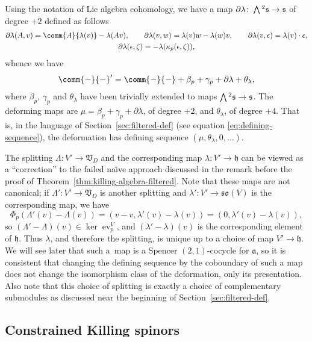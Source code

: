 \documentclass[10pt,a4paper]{amsart}
\numberwithin{equation}{section}
\newcommand{\fa}{\mathfrak{a}}
\newcommand{\fh}{\mathfrak{h}}
\newcommand{\fs}{\mathfrak{s}}
\newcommand{\fso}{\mathfrak{so}}
\newcommand{\fV}{\mathfrak{V}}
\newcommand{\Wedge}{\mathchoice{{\textstyle\bigwedge}}{\bigwedge}{\bigwedge}{\bigwedge}}	%
\newcommand{\1}{\mathbbm{1}}
\DeclareMathOperator{\evaluate}{ev}
\begin{document}
Using the notation of Lie algebra cohomology, we have a map $\partial\lambda\colon\Wedge^2\fs\to\fs$ of degree $+2$ defined as follows
\begin{gather*}
	\partial\lambda(A,v) = \comm{A}{\lambda(v)}-\lambda(Av),\qquad
	 \partial\lambda(v,w) = \lambda(v)w-\lambda(w)v,\qquad
	\partial\lambda(v,\epsilon)	= \lambda(v)\cdot\epsilon,\\
	 \partial\lambda(\epsilon,\zeta)	= -\lambda(\kappa_p(\epsilon,\zeta)),
\end{gather*}
whence we have
\[
	\comm{-}{-}' = \comm{-}{-} + \beta_p + \gamma_p + \partial\lambda + \theta_\lambda,
\]
where $\beta_p$, $\gamma_p$ and $\theta_\lambda$ have been trivially extended to maps $\Wedge^2\fs\to\fs$. The deforming maps are $\mu = \beta_p + \gamma_p+\partial\lambda$, of degree $+2$, and $\theta_\lambda$, of degree $+4$. That is, in the language of Section~\ref{sec:filtered-def} (see equation \eqref{eq:defining-sequence}), the deformation has defining sequence $(\mu,\theta_\lambda,0,\dots)$.

The splitting $\Lambda\colon V'\to \fV_D$ and the corresponding map $\lambda \colon V'\to\fh$ can be viewed as a ``correction'' to the failed na\"{\i}ve approach discussed in the remark before the proof of Theorem~\ref{thm:killing-algebra-filtered}. Note that these maps are not canonical; if $\Lambda'\colon V'\to\fV_D$ is another splitting and $\lambda'\colon V'\to\fso(V)$ is the corresponding map, we have
\[
	\Phi_p(\Lambda'(v)-\Lambda(v)) = (v-v,\lambda'(v)-\lambda(v)) = (0,\lambda'(v)-\lambda(v)),
\]
so $(\Lambda'-\Lambda)(v)\in\ker\evaluate^V_p$, and $(\lambda'-\lambda)(v)$ is the corresponding element of $\fh$. Thus $\lambda$, and therefore the splitting, is unique up to a choice of map $V'\to\fh$. We will see later that such a~map is a Spencer $(2,1)$-cocycle for $\fa$, so it is consistent that changing the defining sequence by the coboundary of such a map does not change the isomorphism class of the deformation, only its presentation. Also note that this choice of splitting is exactly a choice of complementary submodules as discussed near the beginning of Section~\ref{sec:filtered-def}.

\subsection{Constrained Killing spinors}
\label{sec:alg-kse}
\end{document}

